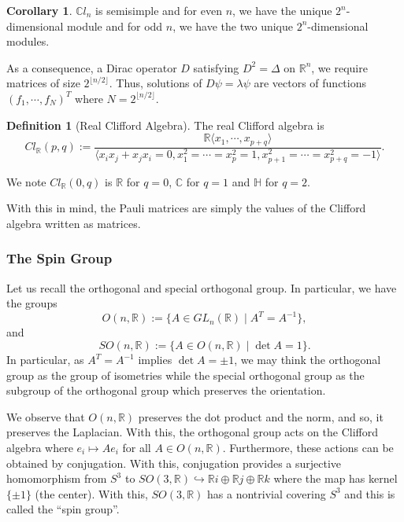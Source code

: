 \documentclass[]{article}
\theoremstyle{definition}
\newtheorem{corollary}{Corollary}[theorem]
\theoremstyle{definition}
\newtheorem{definition}{Definition}[section]
\begin{document}
\begin{corollary}
  \(\mathbb{C}l_n\) is semisimple and for even \(n\), we have the 
  unique \(2^n\)-dimensional module and for odd \(n\), we have the two 
  unique \(2^n\)-dimensional modules.
\end{corollary}

As a consequence, a Dirac operator \(D\) satisfying \(D^2 = \Delta\) on 
\(\mathbb{R}^n\), we require matrices of size \(2^{\lfloor n / 2\rfloor}\).
Thus, solutions of \(D\psi = \lambda \psi\) are vectors of functions 
\((f_1, \cdots, f_N)^T\) where \(N = 2^{\lfloor n / 2 \rfloor}\).

\begin{definition}[Real Clifford Algebra]
  The real Clifford algebra is 
  \[Cl_{\mathbb{R}}(p, q) := \frac{\mathbb{R}\langle x_1, \cdots, x_{p + q}\rangle}
  {\langle x_i x_j + x_j x_i = 0, x_1^2 = \cdots = x_p^2 = 1, 
    x_{p + 1}^2 = \cdots = x_{p + q}^2 = -1\rangle}.\]
\end{definition}

We note \(Cl_{\mathbb{R}}(0, q)\) is \(\mathbb{R}\) for \(q = 0\), \(\mathbb{C}\) 
for \(q = 1\) and \(\mathbb{H}\) for \(q = 2\).

With this in mind, the Pauli matrices are simply the values of the Clifford 
algebra written as matrices.

\subsubsection{The Spin Group}

Let us recall the orthogonal and special orthogonal group. In particular, we 
have the groups 
\[O(n, \mathbb{R}) := \{A \in GL_n(\mathbb{R}) \mid A^T = A^{-1}\},\]
and 
\[SO(n, \mathbb{R}) := \{A \in O(n, \mathbb{R}) \mid \det A = 1\}.\]
In particular, as \(A^T = A^{-1}\) implies \(\det A = \pm 1\), we may think 
the orthogonal group as the group of isometries while the special orthogonal 
group as the subgroup of the orthogonal group which preserves the orientation.

We observe that \(O(n, \mathbb{R})\) preserves the dot product and the norm, 
and so, it preserves the Laplacian. With this, the orthogonal group acts 
on the Clifford algebra where 
\(e_i \mapsto Ae_i\)
for all \(A \in O(n, \mathbb{R})\). Furthermore, these actions can be obtained 
by conjugation. With this, conjugation provides a surjective homomorphism from 
\(S^3\) to \(SO(3, \mathbb{R}) \hookrightarrow \mathbb{R}i \oplus \mathbb{R}j 
\oplus \mathbb{R}k\) where the map has kernel \(\{\pm 1\}\) (the center).
With this, \(SO(3, \mathbb{R})\) has a nontrivial covering \(S^3\) and this 
is called the ``spin group''.
\end{document}
